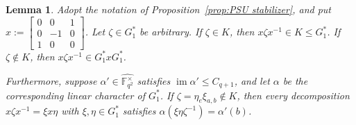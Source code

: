 \documentclass[11pt]{article}
\newtheorem{lemma}[theo]{Lemma}
\theoremstyle{definition}
\numberwithin{equation}{section}
\begin{document}
\begin{lemma}
\label{lem:PSUdcsts}
Adopt the notation of Proposition~\ref{prop:PSU stabilizer}, and put $x := \begin{bmatrix}
0 & 0 & 1 \\
0 & -1 & 0 \\
1 & 0 & 0
\end{bmatrix}$.
Let $\zeta \in G_1^*$ be arbitrary.
If $\zeta \in K$, then $x\zeta x^{-1} \in K \leq G_1^*$.
If $\zeta \notin K$, then $x \zeta x^{-1} \in G_1^* x G_1^*$.

Furthermore, suppose $\alpha' \in \widehat{ \mathbb{F}_{q^2}^\times}$ satisfies $\operatorname{im} \alpha' \leq C_{q+1}$, and let $\alpha$ be the corresponding linear character of $G_1^*$.
If $\zeta = \eta_e \xi_{a,b} \notin K$, then every decomposition $x \zeta x^{-1} = \xi x \eta$ with $\xi,\eta \in G_1^*$ satisfies $\alpha(\xi \eta \zeta^{-1}) = \alpha'(b)$.
\end{lemma}
\end{document}
